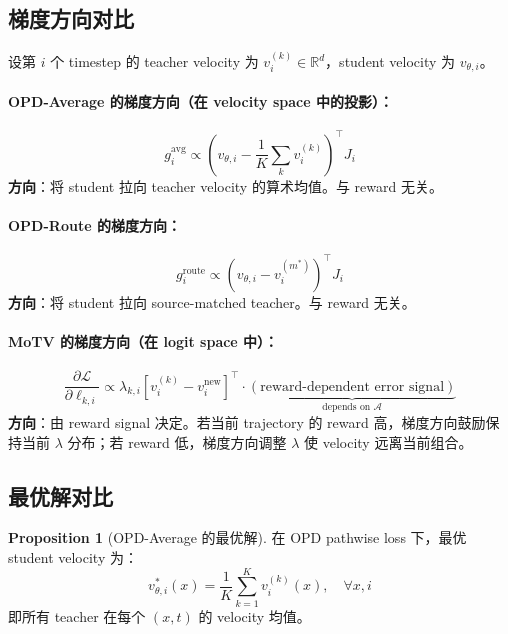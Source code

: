 \documentclass[11pt,a4paper]{article}
\newcommand{\loss}{\mathcal{L}}
\newcommand{\R}{\mathbb{R}}
\newcommand{\adv}{\mathcal{A}}
\theoremstyle{definition}
\newtheorem{proposition}{Proposition}
\begin{document}
\subsection{梯度方向对比}

设第 $i$ 个 timestep 的 teacher velocity 为 $v^{(k)}_i \in \R^d$，student velocity 为 $v_{\theta,i}$。

\paragraph{OPD-Average 的梯度方向（在 velocity space 中的投影）：}
\begin{equation}
g^{\mathrm{avg}}_i \propto \left(v_{\theta,i} - \frac{1}{K}\sum_k v^{(k)}_i\right)^\top J_i
\end{equation}
\textbf{方向}：将 student 拉向 teacher velocity 的算术均值。与 reward 无关。

\paragraph{OPD-Route 的梯度方向：}
\begin{equation}
g^{\mathrm{route}}_i \propto \left(v_{\theta,i} - v^{(m^*)}_i\right)^\top J_i
\end{equation}
\textbf{方向}：将 student 拉向 source-matched teacher。与 reward 无关。

\paragraph{MoTV 的梯度方向（在 logit space 中）：}
\begin{equation}
\frac{\partial \loss}{\partial \ell_{k,i}} \propto \lambda_{k,i}\left[v^{(k)}_i - v^{\mathrm{new}}_i\right]^\top \cdot \underbrace{\left(\text{reward-dependent error signal}\right)}_{\text{depends on } \adv}
\end{equation}
\textbf{方向}：由 reward signal 决定。若当前 trajectory 的 reward 高，梯度方向鼓励保持当前 $\lambda$ 分布；若 reward 低，梯度方向调整 $\lambda$ 使 velocity 远离当前组合。

\subsection{最优解对比}

\begin{proposition}[OPD-Average 的最优解]
\label{prop:opd_avg_opt}
在 OPD pathwise loss 下，最优 student velocity 为：
\begin{equation}
v^*_{\theta,i}(x) = \frac{1}{K}\sum_{k=1}^K v^{(k)}_i(x), \quad \forall x, i
\end{equation}
即所有 teacher 在每个 $(x, t)$ 的 velocity 均值。
\end{proposition}
\end{document}
